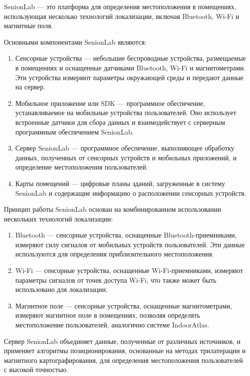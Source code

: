 SenionLab --- это платформа для определения местоположения в помещениях, использующая несколько технологий локализации, включая Bluetooth, Wi-Fi и магнитные поля.

Основными компонентами SenionLab являются:

\begin{enumerate}
    \item Сенсорные устройства --- небольшие беспроводные устройства, размещаемые в помещениях и оснащенные датчиками Bluetooth, Wi-Fi и магнитометрами. Эти устройства измеряют параметры окружающей среды и передают данные на сервер.
    \item Мобильное приложение или SDK --- программное обеспечение, устанавливаемое на мобильные устройства пользователей. Оно использует встроенные датчики для сбора данных и взаимодействует с серверным программным обеспечением SenionLab.
    \item Сервер SenionLab --- программное обеспечение, выполняющее обработку данных, полученных от сенсорных устройств и мобильных приложений, и определение местоположения пользователей.
    \item Карты помещений --- цифровые планы зданий, загруженные в систему SenionLab и содержащие информацию о расположении сенсорных устройств.
\end{enumerate}

Принцип работы SenionLab основан на комбинированном использовании нескольких технологий локализации:

\begin{enumerate}
    \item Bluetooth --- сенсорные устройства, оснащенные Bluetooth-приемниками, измеряют силу сигналов от мобильных устройств пользователей. Эти данные используются для определения приблизительного местоположения.
    \item Wi-Fi --- сенсорные устройства, оснащенные Wi-Fi-приемниками, измеряют параметры сигналов от точек доступа Wi-Fi, что также может быть использовано для локализации.
    \item Магнитное поле --- сенсорные устройства, оснащенные магнитометрами, измеряют магнитное поле в помещениях, позволяя определять местоположение пользователей, аналогично системе IndoorAtlas.
\end{enumerate}

Сервер SenionLab объединяет данные, полученные от различных источников, и применяет алгоритмы позиционирования, основанные на методах трилатерации и магнитного картографирования, для определения местоположения пользователей с высокой точностью.

